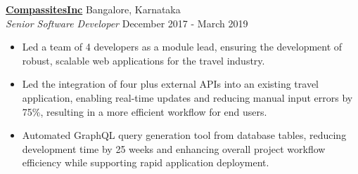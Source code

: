 \textbf{\href{https://www.linkedin.com/company/compassites-software-solutions/}{CompassitesInc}} \hfill Bangalore, Karnataka\\
\textit{Senior Software Developer} \hfill December 2017 - March 2019
\begin{itemize}[leftmargin=*]
  \itemsep0em
  \item Led a team of 4 developers as a module lead, ensuring the development of robust, scalable web applications for the
    travel industry.
  \item Led the integration of four plus external APIs into an existing travel application, enabling real-time updates and reducing manual input errors by 75\%, resulting in a more efficient workflow for end users.
  \item Automated GraphQL query generation tool from database tables, reducing development time by 25 weeks and enhancing overall project workflow efficiency while supporting rapid application deployment.
\end{itemize}
